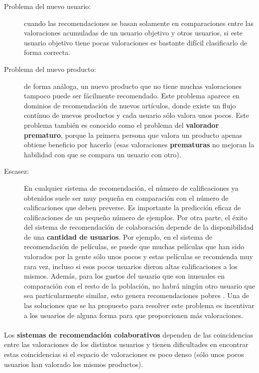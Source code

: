 \documentclass[12pt,letterpaper,oneside] {memoir}
\begin{document}
\begin{description}

\item[Problema del nuevo usuario:] cuando las recomendaciones se basan solamente en comparaciones entre las valoraciones acumuladas de un usuario objetivo y otros usuarios, si este usuario objetivo tiene pocas valoraciones es bastante difícil clasificarlo de forma correcta.

\item[Problema del nuevo producto:] de forma análoga, un nuevo producto que no tiene muchas valoraciones tampoco puede ser fácilmente recomendado. Este problema aparece en dominios de recomendación de nuevos artículos, donde existe un flujo contínuo de nuevos productos y cada usuario sólo valora unos pocos. Este problema también es conocido como el problema del \textbf{valorador prematuro}, porque la primera persona que valora un producto apenas obtiene beneficio por hacerlo (esas valoraciones \textbf{prematuras} no mejoran la habilidad con que se compara un usuario con otro). 

\item[Escasez:] En cualquier sistema de recomendación, el número de calificaciones ya obtenidos suele ser muy pequeña en comparación con el número de calificaciones que deben preverse. Es importante la predicción eficaz de calificaciones de un pequeño número de ejemplos. Por otra parte, el éxito del sistema de recomendación de colaboración depende de la disponibilidad de una \textbf{cantidad de usuarios}. Por ejemplo, en el sistema de recomendación de películas, se puede que muchas películas que han sido valorados por la gente sólo unos pocos y estas películas se recomienda muy rara vez, incluso si esos pocos usuarios dieron altas calificaciones a los mismos. Además, para los gustos del usuario que son inusuales en comparación con el resto de la población, no habrá ningún otro usuario que sea particularmente similar, esto genera recomendaciones pobres \citep{Adomavicius2005,Balabanovic1997}. Una de las soluciones que se ha propuesto para resolver este problema es incentivar a los usuarios de alguna forma para que proporcionen más valoraciones.

\end{description}

\paragraph{}
Los \textbf{sistemas de recomendación colaborativos} dependen de las coincidencias entre las valoraciones de los distintos usuarios y tienen dificultades en encontrar estas coincidencias si el espacio de valoraciones es poco denso (sólo unos pocos usuarios han valorado los mismos productos). 
\end{document}
